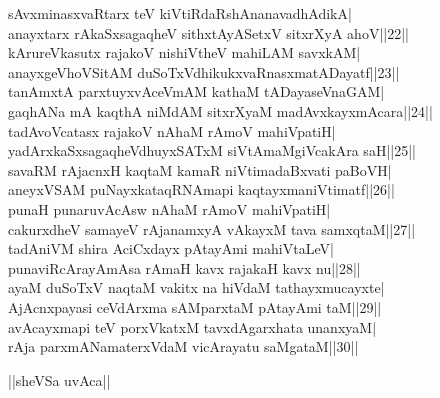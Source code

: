 \documentclass{article}
\begin{document}
sAvxminasxvaRtarx teV kiVtiRdaRshAnanavadhAdikA|\\
anayxtarx rAkaSxsagaqheV sithxtAyASetxV sitxrXyA ahoV||22||\\
kArureVkasutx rajakoV nishiVtheV mahiLAM savxkAM|\\
anayxgeVhoVSitAM duSoTxVdhikukxvaRnasxmatADayatf||23||\\
tanAmxtA parxtuyxvAceVmAM kathaM tADayaseVnaGAM|\\
gaqhANa mA kaqthA niMdAM sitxrXyaM madAvxkayxmAcara||24||\\
tadAvoVcatasx rajakoV nAhaM rAmoV mahiVpatiH|\\
yadArxkaSxsagaqheVdhuyxSATxM siVtAmaMgiVcakAra saH||25||\\
savaRM rAjacnxH kaqtaM kamaR niVtimadaBxvati paBoVH|\\
aneyxVSAM puNayxkataqRNAmapi kaqtayxmaniVtimatf||26||\\
punaH punaruvAcAsw nAhaM rAmoV mahiVpatiH|\\
cakurxdheV samayeV rAjanamxyA vAkayxM tava samxqtaM||27||\\
tadAniVM shira AciCxdayx pAtayAmi mahiVtaLeV|\\
punaviRcArayAmAsa rAmaH kavx rajakaH kavx nu||28||\\
ayaM duSoTxV naqtaM vakitx na hiVdaM tathayxmucayxte|\\
AjAcnxpayasi ceVdArxma sAMparxtaM pAtayAmi taM||29||\\
avAcayxmapi teV porxVkatxM tavxdAgarxhata unanxyaM|\\
rAja parxmANamaterxVdaM vicArayatu saMgataM||30||\\

\begin{center}
||sheVSa uvAca||
\end{center}
\end{document}
